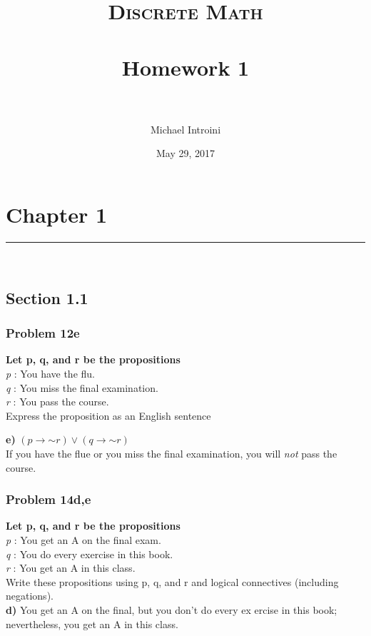 \documentclass[paper=a4, fontsize=11pt]{scrartcl} %
\title{	
\normalfont \normalsize 
\textsc{Discrete Math} \\ [25pt] %
\horrule{0.5pt} \\[0.2cm] %
\large Homework 1 \\ %
\horrule{2pt} \\[0.2cm] %
}
\author{Michael Introini} %
\date{\normalsize{May 29, 2017}} %
\newcommand*{\oldneg}{\mathord{\sim}}
\newcommand{\horrule}[1]{\rule{\linewidth}{#1}} %
\begin{document}
\maketitle %


\section*{Chapter 1}

\horrule{0.5pt} \\ %
\subsection*{Section 1.1}
\subsubsection*{Problem 12e}
\textbf{Let p, q, and r be the propositions}\\
\emph{p} : You have the flu.\\
\emph{q} : You miss the final examination.\\
\emph{r} : You pass the course.\\

Express the proposition as an English sentence

\textbf{e)} $(p \to \oldneg r) \lor (q \to \oldneg r)$\\

If you have the flue or you miss the final examination, you will \emph{not} pass the course.


\subsubsection*{Problem 14d,e}
\textbf{Let p, q, and r be the propositions}\\
\emph{p} : You get an A on the final exam.\\
\emph{q} : You do every exercise in this book.\\
\emph{r} : You get an A in this class.\\

Write these propositions using p, q, and r and logical connectives (including negations).\\
\textbf{d)} You get an A on the final, but you don't do every ex
ercise in this book; nevertheless, you get an A in this class.\\
\end{document}
